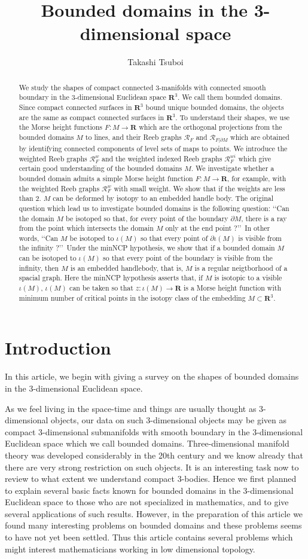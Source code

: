 \documentclass{amsart}
\numberwithin{equation}{section}
\newcommand{\RR}{{\boldsymbol{R}}}
\newcommand{\lra}{\longrightarrow}
\newcommand{\bd}{\partial}
\newcommand{\abstracttext}{We study the shapes of compact connected 3-manifolds with connected smooth boundary in the 3-dimensional Euclidean space $\boldsymbol{R}^3$. We call them bounded domains. Since compact connected surfaces in $\boldsymbol{R}^3$ bound unique bounded domains, the objects are the same as compact connected surfaces in $\boldsymbol{R}^3$. To understand their shapes, we use the Morse height functions $F: M\longrightarrow \boldsymbol{R}$ which are the orthogonal projections from the bounded domains $M$ to lines, and their Reeb graphs $\mathcal{R}_F$ and $\mathcal{R}_{F|\partial M}$ which are obtained by identifying connected components of level sets of maps to points. We introduce the weighted Reeb graphs $\mathcal{R}_F^w$ and the weighted indexed Reeb graphs $\mathcal{R}_F^{wi}$ which give certain good understanding of the bounded domains $M$. We investigate whether a bounded domain admits a simple Morse height function $F:M\lra \RR$, for example, with the weighted Reeb graphs $\mathcal{R}_F^w$ with small weight. We show that if the weights are less than 2. $M$ can be deformed by isotopy to an embedded handle body. The original question which lead us to investigate bounded domains is the following question: \lq\lq{}Can the domain $M$ be isotoped so that, for every point of the boundary $\partial M$, there is a ray from the point which intersects the domain $M$ only at the end point ?\rq\rq\ In other words, \lq\lq{}Can $M$ be isotoped to $\iota(M)$ so that every point of $\bd \iota (M)$ is visible from the infinity ?\rq\rq\ Under the minNCP hypothesis, we show that if a bounded domain $M$ can be isotoped to $\iota(M)$ so that every point of the boundary is visible from the infinity, then $M$ is an embedded handlebody, that is, $M$ is a regular neigtborhood of a spacial graph.  Here the minNCP hypothesis asserts that, if $M$ is isotopic to a visible $\iota(M)$, $\iota(M)$ can be taken so that $z:\iota(M)\lra \RR$ is a Morse height function with minimum number of critical points in the isotopy class of the embedding $M\subset \RR^3$.}
\begin{document}
\title{Bounded domains in the 3-dimensional space}
\author{Takashi Tsuboi}
\address{Takashi Tsuboi, University of Tokyo, Meguro-ku Komaba 3-8-1, Tokyo 153-8914, Japan. }
%
%
\subjclass{
57K30, %
57M15, %
05C10, %
57K10, %
57M15%
}

\maketitle

\begin{abstract}
\abstracttext
\end{abstract}

\section*{Introduction}
\label{sec:0}

In this article, we begin with giving a survey on the shapes of bounded domains in the 3-dimensional Euclidean space. 

As we feel living in the space-time and things are usually thought as 3-dimensional objects, our data on such 3-dimensional objects may be given as compact 3-dimensional submanifolds with smooth boundary in the 3-dimensional Euclidean space which we call bounded domains.
Three-dimensional manifold theory was developed considerably in the 20th century and we know already that there are very strong restriction on such objects. It is an interesting task now to review to what extent we understand compact 3-bodies. Hence we first planned to explain several basic facts known for  bounded domains in the 3-dimensional Euclidean space to those who are not specialized in mathematics, and to give several applications of such results. However, in the preparation of this article we found many interesting problems on bounded domains and these problems seems to have not yet been settled. Thus this article contains several problems which might interest mathematicians working in low dimensional topology.
\end{document}
